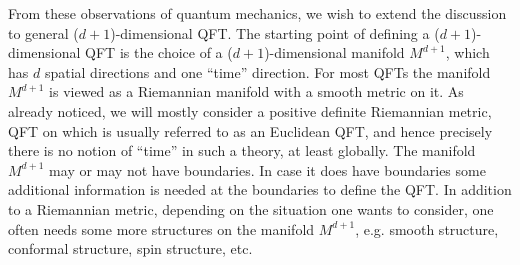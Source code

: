 From these observations of quantum mechanics, we wish to extend the
discussion to general ($d+1$)-dimensional QFT. The starting point
of defining a ($d+1$)-dimensional QFT is the choice of a ($d+1$)-dimensional
manifold $M^{d+1}$, which has $d$ spatial directions and one ``time''
direction. For most QFTs the manifold $M^{d+1}$ is viewed as a Riemannian
manifold with a smooth metric on it. As already noticed, we will mostly
consider a positive definite Riemannian metric, QFT on which is usually
referred to as an Euclidean QFT, and hence precisely there is no notion
of ``time'' in such a theory, at least globally. The manifold $M^{d+1}$
may or may not have boundaries. In case it does have boundaries some
additional information is needed at the boundaries to define the QFT.
In addition to a Riemannian metric, depending on the situation one
wants to consider, one often needs some more structures on the manifold
$M^{d+1}$, e.g. smooth structure, conformal structure, spin structure,
etc.

